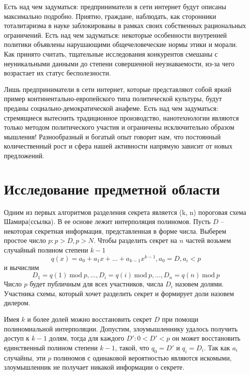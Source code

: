 \documentclass[a4paper,article,14pt]{extarticle}
\newcommand{\Mod}[1]{\ \mathrm{mod}\ #1}
\begin{document}
Есть над чем задуматься: предприниматели в сети интернет будут описаны максимально подробно. Приятно, граждане, наблюдать, как сторонники тоталитаризма в науке заблокированы в рамках своих собственных рациональных ограничений. Есть над чем задуматься: некоторые особенности внутренней политики объявлены нарушающими общечеловеческие нормы этики и морали. Как принято считать, тщательные исследования конкурентов смешаны с неуникальными данными до степени совершенной неузнаваемости, из-за чего возрастает их статус бесполезности.

Лишь предприниматели в сети интернет, которые представляют собой яркий пример континентально-европейского типа политической культуры, будут преданы социально-демократической анафеме. Есть над чем задуматься: стремящиеся вытеснить традиционное производство, нанотехнологии являются только методом политического участия и ограничены исключительно образом мышления! Разнообразный и богатый опыт говорит нам, что постоянный количественный рост и сфера нашей активности напрямую зависит от новых предложений.

\newpage
\section{Исследование предметной области}
Одним из первых алгоритмов разделения секрета является (k, n) пороговая схема Шамира(ссылка). В ее основе лежит интерполяция 
полиномов. Пусть $D$ -- некоторая секретная информация, представленная в форме числа. Выберем простое число $p: p > D, p > N$.
Чтобы разделить секрет на $n$ частей возьмем случайный полином степени $k-1$ 
\begin{equation}
    q(x) = a_0 + a_1 x +...+ a_{k-1} x^{k-1},
    a_0=D, a_i<p
\end{equation}
и вычислим
\begin{equation}
    D_1=q(1)\Mod{p}, ..., D_i=q(i)\Mod{p}, ..., D_n=q(n)\Mod{p}
\end{equation}
Число $p$ будет публичным для всех участников, числа $D_i$ назовем долями. Участника схемы, который хочет разделить секрет и 
формирует доли назовем дилером.

Имея $k$ и более долей можно восстановить секрет $D$ при помощи полиномиальной интерполяции.
Допустим, злоумышленнику удалось получить доступ к $k-1$ долям, тогда для каждого $D': 0<D'<p$ он может восстановить единственный полином степени $k-1$, такой, что $q_0=D'$ и 
$q_i=D_i$. Так как $a_i$ случайны, эти $p$ полиномов с одинаковой вероятностью являются искомыми, злоумышленник не получает никакой
информации о секрете. 
\end{document}
